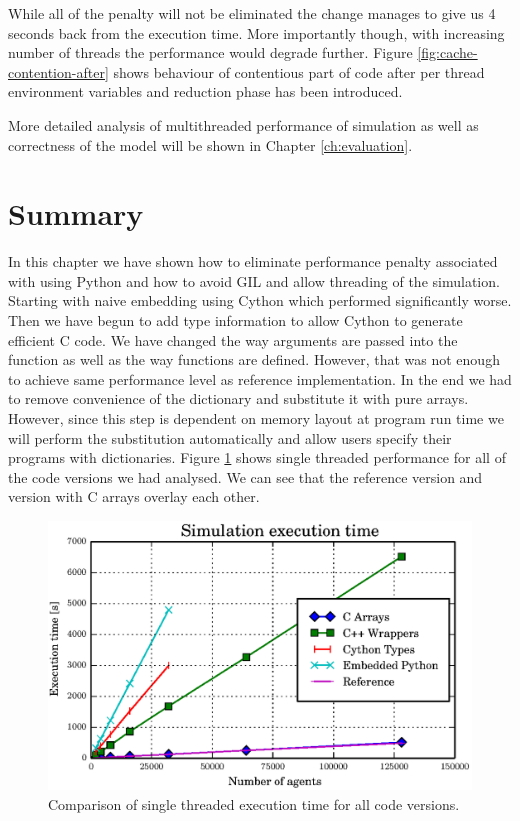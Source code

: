 \documentclass[12pt, a4paper]{report}
\begin{document}
While all of the penalty will not be eliminated the change manages to give us
4 seconds back from the execution time. More importantly though, with increasing
number of threads the performance would degrade further. Figure
\ref{fig:cache-contention-after} shows behaviour of contentious part of code
after per thread environment variables and reduction phase has been introduced.

More detailed analysis of multithreaded performance of simulation as well as
correctness of the model will be shown in Chapter \ref{ch:evaluation}.

\section{Summary}\label{sec:simple-lerm-summ}
In this chapter we have shown how to eliminate performance penalty associated
with using Python and how to avoid GIL and allow threading of the simulation.
Starting with naive embedding using Cython which performed significantly worse.
Then we have begun to add type information to allow Cython to generate efficient
C code. We have changed the way arguments are passed into the function as well
as the way functions are defined. However, that was not enough to achieve
same performance level as reference implementation. In the end we had to
remove convenience of the dictionary and substitute it with pure arrays.
However, since this step is dependent on memory layout at program run time
we will perform the substitution automatically and allow users specify
their programs with dictionaries. Figure \ref{fig:compared-single-perf} shows
single threaded performance for all of the code versions we had analysed.
We can see that the reference version and version with C arrays overlay
each other.

\begin{figure}[H]
  \begin{center}
    \includegraphics[width=\columnwidth]{graphs/compared-single-perf.eps}
    \caption{Comparison of single threaded execution time for all code versions.}
    \label{fig:compared-single-perf}
  \end{center}
\end{figure}
\end{document}
